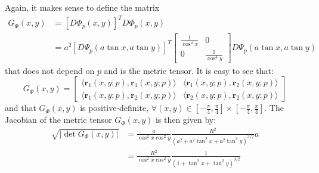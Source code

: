 Again, it makes sense to define the matrix 
\begin{align}
	G_{\Phi}(x,y) &= [D\Phi_{p}(x,y)]^TD\Phi_{p}(x,y) \\
	&= a^2
	[D\Psi_{p}(a\tan{x},a\tan{y})]^T
	\begin{bmatrix}
		\frac{1}{\cos^4 x} & 0 \\ 
		0 & \frac{1}{\cos^4 y} 
	\end{bmatrix}
	D\Psi_{p}(a\tan{x}, a\tan{y})
\end{align}
that does not depend on $p$ and is the  metric tensor.
It is easy to see that:
\begin{equation}
	\label{chp3-eqangle-phi-metric-tensor}
	G_{\Phi}(x,y) = 
	\begin{bmatrix}
		\langle \boldsymbol{r}_{1}(x,y;p), \boldsymbol{r}_{1}(x,y;p) \rangle & 
		\langle \boldsymbol{r}_{1}(x,y;p), \boldsymbol{r}_{2}(x,y;p) \rangle \\
		\langle \boldsymbol{r}_{1}(x,y;p), \boldsymbol{r}_{2}(x,y;p) \rangle  &
		\langle \boldsymbol{r}_{2}(x,y;p), \boldsymbol{r}_{2}(x,y;p) \rangle 
	\end{bmatrix}
\end{equation}
and that $G_{\Phi}(x,y)$ is positive-definite, 
$\forall (x,y) \in [-\frac{\pi}{4},\frac{\pi}{4}] 
\times [-\frac{\pi}{4},\frac{\pi}{4}]$.
The Jacobian of the metric tensor $G_{\Phi}(x,y)$ is then given by:
\begin{align}
	\sqrt{|\det{G_{\Phi}(x,y)}|} &= \frac{a}{\cos^2 x \cos^2 y}
	\frac{R^2}{(a^2 + a^2\tan^2x + a^2\tan^2y)^{3/2}}a\\
	&= \frac{R^2}{\cos^2 x \cos^2 y}
	\frac{1}{(1 + \tan^2x + \tan^2y)^{3/2}}
\end{align}

